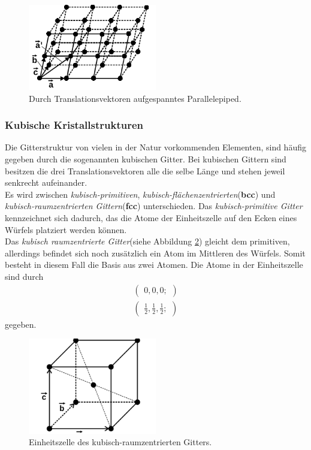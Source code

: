 \begin{figure}[hhh]
\centering
\includegraphics[width=0.5\textwidth]{abbildungen/epiped.png}
\caption{Durch Translationsvektoren aufgespanntes Parallelepiped.\cite{sample}}
\label{fig:abb2}
\end{figure}

\subsubsection{Kubische Kristallstrukturen}
\label{subsubsec:kubische_gitter}

Die Gitterstruktur von vielen in der Natur vorkommenden Elementen,
sind häufig gegeben durch die sogenannten kubischen Gitter.
Bei kubischen Gittern sind besitzen die drei Translationsvektoren
alle die selbe Länge und stehen jeweil senkrecht aufeinander.\\
Es wird zwischen \textit{kubisch-primitiven},
\textit{kubisch-flächenzentrierten}(\textbf{bcc}) und \\
\textit{kubisch-raumzentrierten Gittern}(\textbf{fcc}) unterschieden.
Das \textit{kubisch-primitive Gitter}
kennzeichnet sich dadurch,
das die Atome der Einheitszelle auf den Ecken
eines Würfels platziert werden können.\\
Das \textit{kubisch raumzentrierte Gitter}(siehe Abbildung \ref{fig:bcc})
gleicht dem primitiven, allerdings befindet sich noch
zusätzlich ein Atom im Mittleren des Würfels.
Somit besteht in diesem Fall die Basis aus zwei Atomen.
Die Atome in der Einheitszelle sind durch
\begin{align}
\label{eqn:2*}
\begin{pmatrix}
0, 0, 0;
\end{pmatrix}\\
\begin{pmatrix}
\frac{1}{2}, \frac{1}{2}, \frac{1}{2};
\end{pmatrix}
\end{align}
gegeben.\\

\begin{figure}[hhh]
\centering
\includegraphics[width=0.5\textwidth]{abbildungen/bcc.png}
\caption{Einheitszelle des kubisch-raumzentrierten Gitters.\cite{sample}}
\label{fig:bcc}
\end{figure}

